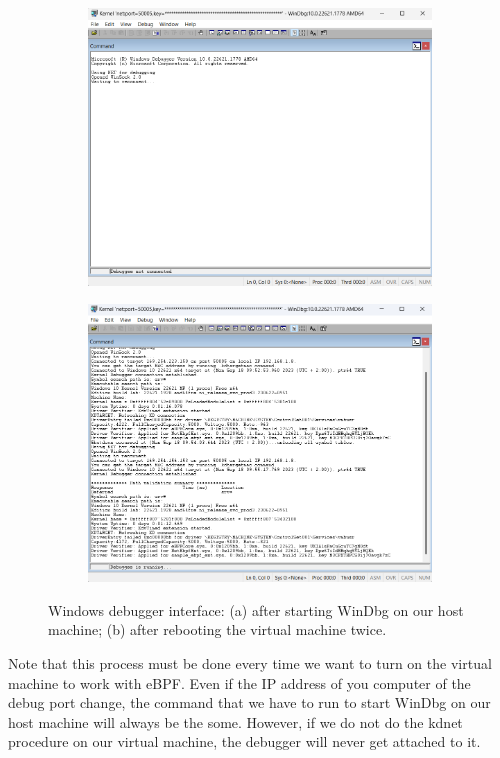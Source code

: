 \begin{figure}[h]
	\centering
	\begin{subfigure}{.5\textwidth}
		\centering
		\includegraphics[width=0.7\linewidth]{images/WindowsDevelopment/WinDbg_nc.png}
		\caption{}
		\label{fig:WinDbgNc}
	\end{subfigure}%
	\begin{subfigure}{.5\textwidth}
		\centering
		\includegraphics[width=0.7\linewidth]{images/WindowsDevelopment/WinDbg_r.png}
		\caption{}
		\label{fig:WinDbgR}
	\end{subfigure}	
	\caption{Windows debugger interface: (a) after starting WinDbg on our host machine; (b) after rebooting the virtual machine twice.}
	\label{fig:WinDbg}
\end{figure}

Note that this process must be done every time we want to turn on the virtual machine to work with eBPF.
Even if the IP address of you computer of the debug port change, the command that we have to run to start WinDbg on our host machine will always be the some.
However, if we do not do the kdnet procedure on our virtual machine, the debugger will never get attached to it.

